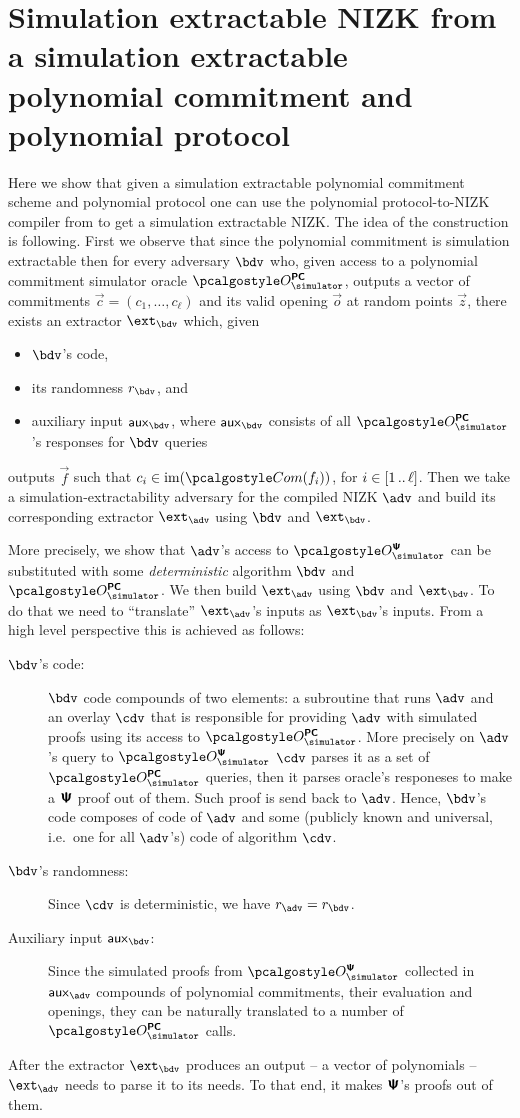 \documentclass[runningheads,11pt]{llncs}
\let\spvec\vec \let\vec\accentvec
\let\vec\spvec
\begin{document}
\section{Simulation extractable NIZK from a simulation extractable polynomial
  commitment and polynomial protocol}
Here we show that given a simulation extractable polynomial commitment scheme
and polynomial protocol one can use the polynomial protocol-to-NIZK compiler
from \cite{EPRINT:GabWilCio19} to get a simulation extractable NIZK. The idea of
the construction is following. First we observe that since the polynomial
commitment is simulation extractable then for every adversary $\bdv$ who, given
access to a polynomial commitment simulator oracle $\oraclespcom$, outputs a
vector of commitments $\vec{c} = (c_1, \ldots, c_\ell)$ and its valid opening $\vec{o}$ at random points
$\vec{z}$, there exists an
extractor $\ext_\bdv$ which, given
\begin{itemize}
\item $\bdv$'s code,
\item its randomness $r_\bdv$, and
\item auxiliary input $\aux_\bdv$, where $\aux_\bdv$ consists of all
  $\oraclespcom$'s responses for $\bdv$ queries
\end{itemize}
outputs $\vec{f}$ such that $c_i \in \image(\com(f_i))$, for
$i \in [1 \, .. \, \ell]$.  Then we take a simulation-extractability adversary for
the compiled NIZK $\adv$ and build its corresponding extractor $\ext_\adv$ using
$\bdv$ and $\ext_\bdv$.

More precisely, we show that $\adv$'s access to $\oraclesps$ can be substituted
with some \emph{deterministic} algorithm $\bdv$ and $\oraclespcom$. We then
build $\ext_\adv$ using $\bdv$ and $\ext_\bdv$. To do that we need
to ``translate'' $\ext_\adv$'s inputs as $\ext_\bdv$'s inputs. From a high level
perspective this is achieved as follows:
\begin{description}
\item[$\bdv$'s code:] $\bdv$ code compounds of two elements: a subroutine that
  runs $\adv$ and an overlay $\cdv$ that is responsible for providing $\adv$ with
  simulated proofs using its access to $\oraclespcom$. More precisely on
  $\adv$'s query to $\oraclesps$ $\cdv$ parses it as a set of $\oraclespcom$
  queries, then it parses oracle's responeses to make a $\bm{\mathsf{\Psi}}$ proof out of
  them. Such proof is send back to $\adv$. Hence, $\bdv$'s code composes of code
  of $\adv$ and some (publicly known and universal, i.e.~one for all $\adv$'s)
  code of algorithm $\cdv$. 
\item[$\bdv$'s randomness:] Since $\cdv$ is deterministic, we have
  $r_\adv = r_\bdv$.
\item[Auxiliary input $\aux_\bdv$:] Since the simulated proofs from $\oraclesps$
  collected in $\aux_\adv$ compounds of polynomial commitments, their evaluation
  and openings, they can be naturally translated to a number of $\oraclespcom$
  calls.
\end{description}
After the extractor $\ext_\bdv$ produces an output -- a vector of polynomials --
$\ext_\adv$ needs to parse it to its needs. To that end, it makes $\bm{\mathsf{\Psi}}$'s proofs
out of them.
\end{document}
